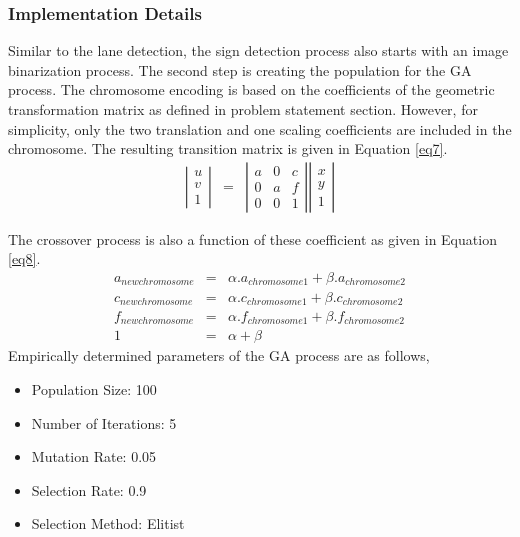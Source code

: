 \documentclass[a4paper,oneside,12pt]{report}
\begin{document}
\subsubsection{Implementation Details}
Similar to the lane detection, the sign detection process also starts with an image binarization process. The second step is creating the population for the GA process. The chromosome encoding is based on the coefficients of the geometric transformation matrix as defined in problem statement section. However, for simplicity, only the two translation and one scaling coefficients are included in the chromosome. The resulting transition matrix is given in Equation \ref{eq7}.
\begin{eqnarray}
\label{eq7}
\left| \begin{array}{ccc} u \\ v \\ 1 \end{array} \right| &=& 
\left| \begin{array}{ccc} a & 0 & c \\ 0 & a & f \\ 0 & 0 & 1 \end{array} \right| \left| \begin{array}{ccc} x \\ y \\ 1 \end{array} \right|
\end{eqnarray}
\par
The crossover process is also a function of these coefficient as given in Equation \ref{eq8}.
\begin{eqnarray}
\label{eq8}
\nonumber a_{newchromosome}&=&\alpha.a_{chromosome1}+\beta.a_{chromosome2} \\
c_{newchromosome}&=&\alpha.c_{chromosome1}+\beta.c_{chromosome2} \\
\nonumber f_{newchromosome}&=&\alpha.f_{chromosome1}+\beta.f_{chromosome2} \\
\nonumber 1&=&\alpha+\beta
\end{eqnarray}
Empirically determined parameters of the GA process are as follows,
\begin{itemize}
		\item Population Size: 100
		\item Number of Iterations: 5
		\item Mutation Rate: 0.05
		\item Selection Rate: 0.9
		\item Selection Method: Elitist
\end{itemize}
\end{document}
